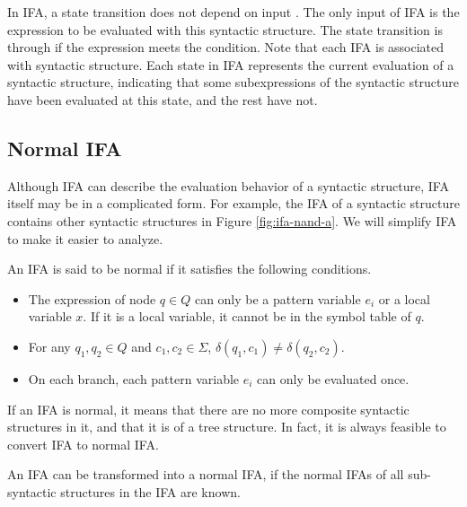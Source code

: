 
In IFA, a state transition does not depend on input . The only input of IFA is the expression to be evaluated with this syntactic structure. The state transition is through if the expression meets the condition. Note that each IFA is associated with syntactic structure. Each state in IFA represents the current evaluation of a syntactic structure, indicating that some subexpressions of the syntactic structure have been evaluated at this state, and the rest have not.

\subsection{Normal IFA}

Although IFA can describe the evaluation behavior of a syntactic structure, IFA itself may be in a complicated form. For example, the IFA of a syntactic structure contains other syntactic structures in Figure \ref{fig:ifa-nand-a}. We will simplify IFA to make it easier to analyze.

\begin{Def}
    \label{def:nmlifa}
    An IFA is said to be normal if it satisfies the following conditions.
    \begin{itemize}
        \item The expression of node $q \in Q$ can only be a pattern variable $e_i$ or a local variable $x$. If it is a local variable, it cannot be in the symbol table of $q$.
        \item For any $q_1,q_2 \in Q$ and $c_1, c_2 \in \Sigma$, $\delta(q_1, c_1) \neq \delta(q_2, c_2)$.
        \item On each branch, each pattern variable $e_i$ can only be evaluated once.
    \end{itemize}
\end{Def}

If an IFA is normal, it means that there are no more composite syntactic structures in it, and that it is of a tree structure.
In fact, it is always feasible to convert IFA to normal IFA.

\begin{mythm}
    \label{mythm:nmlifa}
    An IFA can be transformed into a normal IFA, if the normal IFAs of all sub-syntactic structures in the IFA are known.
\end{mythm}

